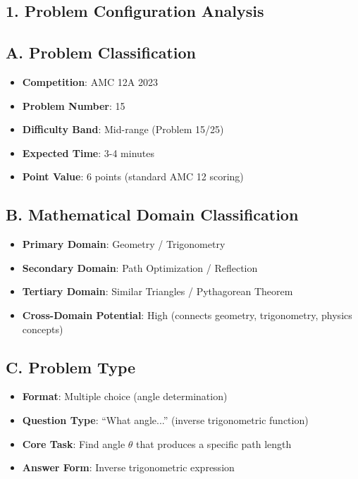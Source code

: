 \documentclass[11pt]{article}
\begin{document}
\begin{problembox}
\section*{1. Problem Configuration Analysis}

\subsection*{A. Problem Classification}
\begin{itemize}[leftmargin=*]
    \item \textbf{Competition}: AMC 12A 2023
    \item \textbf{Problem Number}: 15
    \item \textbf{Difficulty Band}: Mid-range (Problem 15/25)
    \item \textbf{Expected Time}: 3-4 minutes
    \item \textbf{Point Value}: 6 points (standard AMC 12 scoring)
\end{itemize}

\subsection*{B. Mathematical Domain Classification}
\begin{itemize}[leftmargin=*]
    \item \textbf{Primary Domain}: Geometry / Trigonometry
    \item \textbf{Secondary Domain}: Path Optimization / Reflection
    \item \textbf{Tertiary Domain}: Similar Triangles / Pythagorean Theorem
    \item \textbf{Cross-Domain Potential}: High (connects geometry, trigonometry, physics concepts)
\end{itemize}

\subsection*{C. Problem Type}
\begin{itemize}[leftmargin=*]
    \item \textbf{Format}: Multiple choice (angle determination)
    \item \textbf{Question Type}: ``What angle...'' (inverse trigonometric function)
    \item \textbf{Core Task}: Find angle $\theta$ that produces a specific path length
    \item \textbf{Answer Form}: Inverse trigonometric expression
\end{itemize}


\end{problembox}
\end{document}
